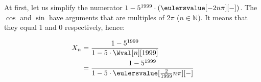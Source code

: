 \documentclass[a4paper]{article}
\theoremstyle{break}
\theoremstyle{break}
\begin{document}
At first, let us simplify the numerator $1 - 5^{1999} \cdot (\eulersvalue[-2 n \pi][-])$. The $\cos$ and $\sin$ have arguments that are multiples of $2\pi$ ($n \in \mathbb{N}$). It means that they equal  1 and 0 respectively, hence:

\begin{equation*}
  \begin{split}
    X_n &= \frac{1 - 5^{1999}}
                {1 - 5 \cdot \Wval[n][1999]} \\
        &= \frac{1 - 5^{1999}}
                {1 - 5 \cdot \eulersvalue[\frac{2}{1999} n \pi][-]}
  \end{split}
\end{equation*}


\end{document}

